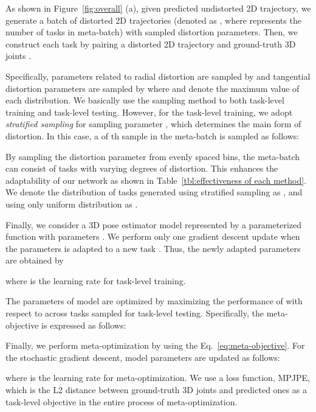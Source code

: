         As shown in Figure~\ref{fig:overall} (a), given predicted undistorted 2D trajectory, we generate a batch of distorted 2D trajectories (denoted as , where  represents the number of tasks in meta-batch) with sampled distortion parameters. Then, we construct each task  by pairing a distorted 2D trajectory  and ground-truth 3D joints .
        
        Specifically, parameters related to radial distortion are sampled by  and tangential distortion parameters are sampled by  where  and  denote the maximum value of each distribution. We basically use the sampling method to both task-level training and task-level testing. However, for the task-level training, we adopt \textit{stratified sampling} for sampling parameter , which determines the main form of distortion. In this case, a  of th sample in the meta-batch is sampled as follows:
        \vspace{-1mm}
        
        
        By sampling the distortion parameter  from evenly spaced bins, the meta-batch can consist of tasks with varying degrees of distortion. This enhances the adaptability of our network as shown in Table~\ref{tbl:effectiveness of each method}. We denote the distribution of tasks generated using stratified sampling as , and using only uniform distribution as .
        
        Finally, we consider a 3D pose estimator model represented by a parameterized function  with parameters . We perform only one gradient descent update when the parameters  is adapted to a new task . Thus, the newly adapted parameters  are obtained by
        \vspace{-1mm}
        
        where  is the learning rate for task-level training.
        
        The parameters  of model are optimized by maximizing the performance of  with respect to  across tasks sampled for task-level testing. Specifically, the meta-objective is expressed as follows:
        \vspace{-1mm}
        
        
        Finally, we perform meta-optimization by using the Eq.~\ref{eq:meta-objective}. For the stochastic gradient descent, model parameters  are updated as follows:
        \vspace{-1mm}
        
        where  is the learning rate for meta-optimization. We use a loss function, MPJPE, which is the L2 distance between ground-truth 3D joints and predicted ones as a task-level objective in the entire process of meta-optimization.
        
